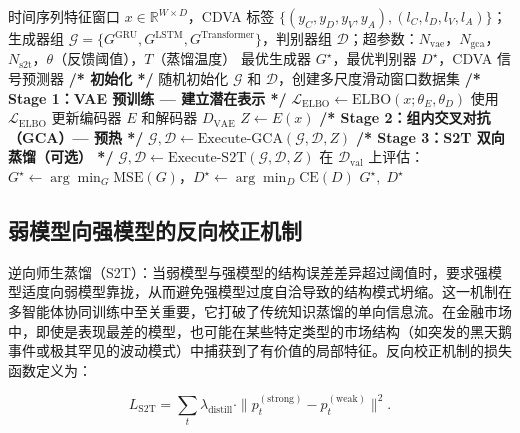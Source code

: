 \begin{algorithm}[H]
\caption{CDVA 结构预测框架总体训练流程}
\label{alg:cdva_overall}
\begin{algorithmic}[0]
\Require 时间序列特征窗口 $x \in \mathbb{R}^{W \times D}$，CDVA 标签 $\{(y_C, y_D, y_V, y_A), (l_C, l_D, l_V, l_A)\}$；生成器组 $\mathcal{G} = \{G^{\text{GRU}}, G^{\text{LSTM}}, G^{\text{Transformer}}\}$，判别器组 $\mathcal{D}$；超参数：$N_{\text{vae}}$，$N_{\text{gca}}$，$N_{\text{s2t}}$，$\theta$（反馈阈值），$T$（蒸馏温度）
\Ensure 最优生成器 $G^{\star}$，最优判别器 $D^{\star}$，CDVA 信号预测器
\Statex
\State \textbf{/* 初始化 */} 随机初始化 $\mathcal{G}$ 和 $\mathcal{D}$，创建多尺度滑动窗口数据集
\Statex
\State \textbf{/* Stage 1：VAE 预训练 — 建立潜在表示 */}
    \State $\mathcal{L}_{\text{ELBO}} \leftarrow \text{ELBO}(x; \theta_E, \theta_D)$
    \State 使用 $\mathcal{L}_{\text{ELBO}}$ 更新编码器 $E$ 和解码器 $D_{\text{VAE}}$
\EndFor
\State $Z \leftarrow E(x)$ 
\Statex
\State \textbf{/* Stage 2：组内交叉对抗（GCA）— 预热 */}
\State $\mathcal{G}, \mathcal{D} \leftarrow \text{Execute-GCA}(\mathcal{G}, \mathcal{D}, Z)$ 
\Statex
\State \textbf{/* Stage 3：S2T 双向蒸馏（可选） */}
    \State $\mathcal{G}, \mathcal{D} \leftarrow \text{Execute-S2T}(\mathcal{G}, \mathcal{D}, Z)$ 
\EndIf
\Statex
\State 在 $\mathcal{D}_{\text{val}}$ 上评估：$G^{\star} \leftarrow \arg\min_G \text{MSE}(G)$，$D^{\star} \leftarrow \arg\min_D \text{CE}(D)$
\State \Return $G^{\star},\; D^{\star}$
\end{algorithmic}
\end{algorithm}

\subsection{弱模型向强模型的反向校正机制}

逆向师生蒸馏（S2T）：当弱模型与强模型的结构误差差异超过阈值时，要求强模型适度向弱模型靠拢，从而避免强模型过度自洽导致的结构模式坍缩。这一机制在多智能体协同训练中至关重要，它打破了传统知识蒸馏的单向信息流。在金融市场中，即使是表现最差的模型，也可能在某些特定类型的市场结构（如突发的黑天鹅事件或极其罕见的波动模式）中捕获到了有价值的局部特征。反向校正机制的损失函数定义为：

\begin{equation}
L_{\text{S2T}}
=
\sum_{t}
\lambda_{\text{distill}}
\cdot
\|p^{(\text{strong})}_t - p^{(\text{weak})}_t\|^2.
\end{equation}

